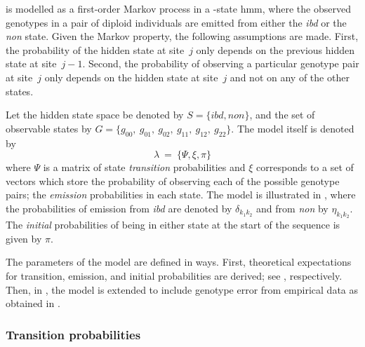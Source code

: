  is modelled as a first-order Markov process in a -state \gls{hmm}, where the observed genotypes in a pair of diploid individuals are emitted from either the \emph{ibd} or the \emph{non} state.
Given the Markov property, the following assumptions are made.
First, the probability of the hidden state at site~$j$ only depends on the previous hidden state at site~${j-1}$.
Second, the probability of observing a particular genotype pair at site~$j$ only depends on the hidden state at site~$j$ and not on any of the other states.

Let the hidden state space be denoted by ${S = \lbrace \textit{ibd},\textit{non} \rbrace}$, and the set of observable states by ${G = \lbrace g_{00},~g_{01},~g_{02},~g_{11},~g_{12},~g_{22} \rbrace}$.
The model itself is denoted by
\begin{equation}\label{eq:hmm_model}
	\lambda ~=~ \lbrace \Psi, \xi, \pi \rbrace
\end{equation}
where $\Psi$ is a matrix of state \emph{transition} probabilities and $\xi$ corresponds to a set of vectors which store the probability of observing each of the possible genotype pairs; \ie the \emph{emission} probabilities in each state.
The model is illustrated in , where the probabilities of emission from \emph{ibd} are denoted by $\delta_{k_1 k_2}$ and from \emph{non} by $\eta_{k_1 k_2}$.
The \emph{initial} probabilities of being in either state at the start of the sequence is given by $\pi$.

%

%

The parameters of the model are defined in  ways.
First, theoretical expectations for transition, emission, and initial probabilities are derived; see , respectively.
Then, in , the model is extended to include genotype error from empirical data as obtained in .




%
\subsubsection{Transition probabilities}
\label{sec:HmmTrans}
%

